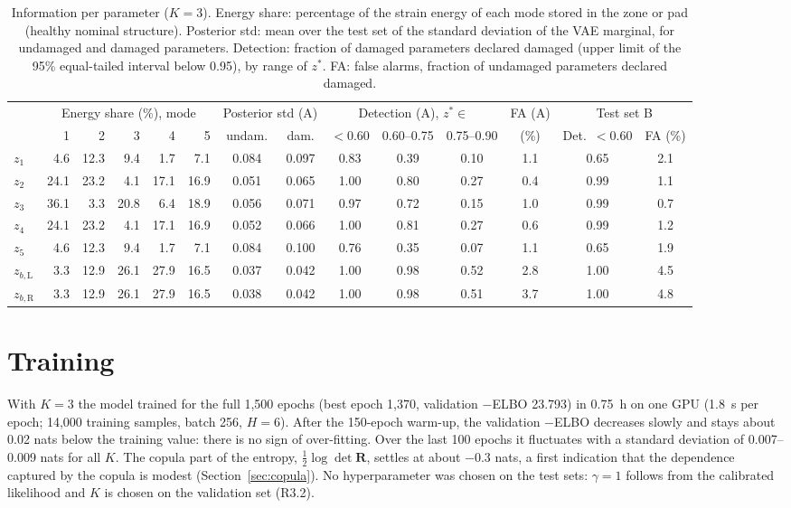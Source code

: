 \documentclass[11pt]{article}
\newcommand{\zb}[1]{z_{b,\mathrm{#1}}}
\begin{document}
\begin{table}[t]
\centering\footnotesize
\setlength{\tabcolsep}{2.6pt}
\caption{Information per parameter ($K=3$). Energy share: percentage of the strain energy of each mode stored in the
zone or pad (healthy nominal structure). Posterior std: mean over the test set of the standard deviation of the VAE
marginal, for undamaged and damaged parameters. Detection: fraction of damaged parameters declared damaged (upper
limit of the 95\% equal-tailed interval below 0.95), by range of $z^*$. FA: false alarms, fraction of undamaged
parameters declared damaged.}
\label{tab:param}
\begin{tabular}{l rrrrr cc ccc c cc}
\toprule
 & \multicolumn{5}{c}{Energy share (\%), mode} & \multicolumn{2}{c}{Posterior std (A)}
 & \multicolumn{3}{c}{Detection (A), $z^*\in$} & FA (A) & \multicolumn{2}{c}{Test set B} \\
\cmidrule(lr){2-6}\cmidrule(lr){7-8}\cmidrule(lr){9-11}\cmidrule(lr){13-14}
 & 1 & 2 & 3 & 4 & 5 & undam. & dam. & $<0.60$ & 0.60--0.75 & 0.75--0.90 & (\%)
 & Det.\ $<0.60$ & FA (\%) \\
\midrule
$z_1$     &  4.6 & 12.3 &  9.4 &  1.7 &  7.1 & 0.084 & 0.097 & 0.83 & 0.39 & 0.10 & 1.1 & 0.65 & 2.1 \\
$z_2$     & 24.1 & 23.2 &  4.1 & 17.1 & 16.9 & 0.051 & 0.065 & 1.00 & 0.80 & 0.27 & 0.4 & 0.99 & 1.1 \\
$z_3$     & 36.1 &  3.3 & 20.8 &  6.4 & 18.9 & 0.056 & 0.071 & 0.97 & 0.72 & 0.15 & 1.0 & 0.99 & 0.7 \\
$z_4$     & 24.1 & 23.2 &  4.1 & 17.1 & 16.9 & 0.052 & 0.066 & 1.00 & 0.81 & 0.27 & 0.6 & 0.99 & 1.2 \\
$z_5$     &  4.6 & 12.3 &  9.4 &  1.7 &  7.1 & 0.084 & 0.100 & 0.76 & 0.35 & 0.07 & 1.1 & 0.65 & 1.9 \\
$\zb{L}$  &  3.3 & 12.9 & 26.1 & 27.9 & 16.5 & 0.037 & 0.042 & 1.00 & 0.98 & 0.52 & 2.8 & 1.00 & 4.5 \\
$\zb{R}$  &  3.3 & 12.9 & 26.1 & 27.9 & 16.5 & 0.038 & 0.042 & 1.00 & 0.98 & 0.51 & 3.7 & 1.00 & 4.8 \\
\bottomrule
\end{tabular}
\end{table}

\section{Training}
With $K=3$ the model trained for the full 1,500 epochs (best epoch 1,370, validation $-$ELBO 23.793) in 0.75~h on one
GPU (1.8~s per epoch; 14,000 training samples, batch 256, $H=6$). After the 150-epoch warm-up, the validation
$-$ELBO decreases slowly and stays about 0.02 nats below the training value: there is no sign of over-fitting. Over the
last 100 epochs it fluctuates with a standard deviation of 0.007--0.009 nats for all $K$. The copula part of the
entropy, $\tfrac12\log\det\mathbf R$, settles at about $-0.3$ nats, a first indication that the dependence captured
by the copula is modest (Section~\ref{sec:copula}). No hyperparameter was chosen on the test sets: $\gamma=1$ follows
from the calibrated likelihood and $K$ is chosen on the validation set (R3.2).
\end{document}
